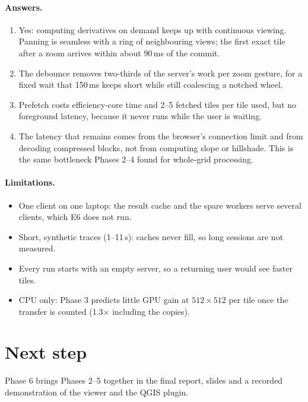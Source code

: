\documentclass[11pt,a4paper]{article}
\begin{document}
\paragraph{Answers.}
\begin{enumerate}
  \item Yes: computing derivatives on demand keeps up with continuous viewing. Panning is seamless with a ring of
  neighbouring views; the first exact tile after a zoom arrives within about 90\,ms of the commit.
  \item The debounce removes two-thirds of the server's work per zoom gesture, for a fixed wait that 150\,ms keeps
  short while still coalescing a notched wheel.
  \item Prefetch costs efficiency-core time and 2--5 fetched tiles per tile used, but no foreground latency, because
  it never runs while the user is waiting.
  \item The latency that remains comes from the browser's connection limit and from decoding compressed blocks, not
  from computing slope or hillshade. This is the same bottleneck Phases 2--4 found for whole-grid processing.
\end{enumerate}

\paragraph{Limitations.}
\begin{itemize}
  \item One client on one laptop: the result cache and the spare workers serve several clients, which E6 does not
  run.
  \item Short, synthetic traces (1--11\,s): caches never fill, so long sessions are not measured.
  \item Every run starts with an empty server, so a returning user would see faster tiles.
  \item CPU only: Phase 3 predicts little GPU gain at $512\times512$ per tile once the transfer is counted
  (1.3$\times$ including the copies).
\end{itemize}

\section{Next step}
Phase 6 brings Phases 2--5 together in the final report, slides and a recorded demonstration of the viewer and the
QGIS plugin.
\end{document}
